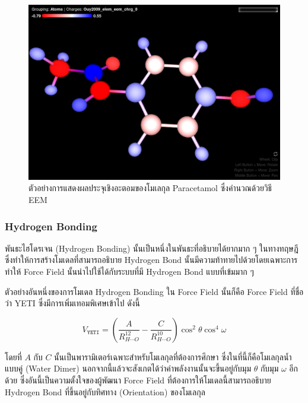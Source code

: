 \begin{figure}[htbp]
  \centering
  \includegraphics[width=0.8\linewidth]{fig/EEM-paracetamol.png}
  \caption{ตัวอย่างการแสดงผลประจุเชิงอะตอมของโมเลกุล Paracetamol ซึ่งคำนวณด้วยวิธี EEM}
  \label{fig:EEM_paracetamol}
\end{figure}

\subsubsection{Hydrogen Bonding}

พันธะไฮโดรเจน (Hydrogen Bonding) นั้นเป็นหนึ่งในพันธะที่อธิบายได้ยากมาก ๆ ในทางทฤษฎี ซึ่งทำให้การสร้างโมเดลที่สามารถอธิบาย Hydrogen
Bond นั้นมีความท้าทายไปด้วยโดยเฉพาะการทำให้ Force Field นั้นนำไปใช้ได้กับระบบที่มี Hydrogen Bond แบบที่เข้มมาก ๆ

ตัวอย่างอันหนึ่งของการโมเดล Hydrogen Bonding ใน Force Field นั้นก็คือ Force Field ที่ชื่อว่า YETI\autocite{vedani1988}
ซึ่งมีการเพิ่มเทอมพิเศษเข้าไป ดังนี้

\begin{equation}
  V_{\texttt{YETI}}
  =
  \left(
  \frac{A}{R^{12}_{H \cdots O}}
  - \frac{C}{R^{10}_{H \cdots O}}
  \right)
  \cos^{2} \theta
  \cos^{4} \omega
\end{equation}

\noindent โดยที่ $A$ กับ $C$ นั้นเป็นพารามิเตอร์เฉพาะสำหรับโมเลกุลที่ต้องการศึกษา ซึ่งในที่นี้ก็คือโมเลกุลน้ำแบบคู่ (Water Dimer)
นอกจากนี้แล้วจะสังเกตได้ว่าค่าพลังงานนั้นจะขึ้นอยู่กับมุม $\theta$ กับมุม $\omega$ อีกด้วย ซึ่งอันนี้เป็นความตั้งใจของผู้พัฒนา Force Field
ที่ต้องการให้โมเดลนี้สามารถอธิบาย Hydrogen Bond ที่ขึ้นอยู่กับทิศทาง (Orientation) ของโมเลกุล

